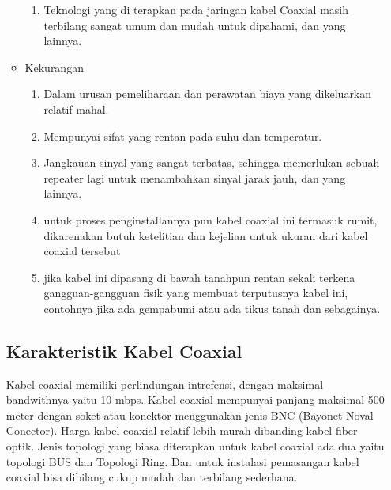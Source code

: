 \begin{itemize}
\begin{itemize}
\begin{enumerate}
					\item Teknologi yang di terapkan pada jaringan kabel Coaxial masih terbilang sangat umum dan mudah untuk dipahami, dan yang lainnya.
				\end{enumerate}
			\item Kekurangan
				\begin{enumerate}
					\item Dalam urusan pemeliharaan dan perawatan biaya yang dikeluarkan relatif mahal.
					\item Mempunyai sifat yang rentan pada suhu dan temperatur.
					\item Jangkauan sinyal yang sangat terbatas, sehingga memerlukan sebuah repeater lagi untuk menambahkan sinyal jarak jauh, dan yang lainnya.
					\item untuk proses penginstallannya pun kabel coaxial ini termasuk rumit, dikarenakan butuh ketelitian dan kejelian untuk ukuran dari kabel coaxial tersebut
					\item jika kabel ini dipasang di bawah tanahpun rentan sekali terkena gangguan-gangguan fisik yang membuat terputusnya kabel ini, contohnya jika ada gempabumi atau ada tikus tanah dan sebagainya.
				\end{enumerate}
		\end{itemize}
	\subsection {Karakteristik Kabel Coaxial}
	Kabel coaxial memiliki perlindungan intrefensi, dengan maksimal bandwithnya yaitu 10 mbps. Kabel coaxial mempunyai panjang maksimal 500 meter dengan soket atau konektor menggunakan jenis BNC (Bayonet Noval Conector). Harga kabel coaxial relatif lebih murah dibanding kabel fiber optik. Jenis topologi yang biasa diterapkan untuk kabel coaxial ada dua yaitu topologi BUS dan Topologi Ring. Dan untuk instalasi pemasangan kabel coaxial bisa dibilang cukup mudah dan terbilang sederhana.
	

\end{itemize}
